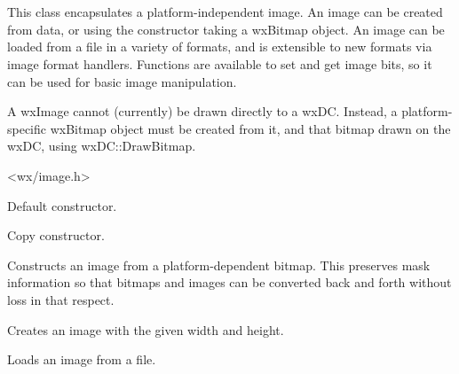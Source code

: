 \section{}\label{wximage}

This class encapsulates a platform-independent image. An image can be created
from data, or using the constructor taking a wxBitmap object. An image
can be loaded from a file in a variety of formats, and is extensible to new formats
via image format handlers. Functions are available to set and get image bits, so
it can be used for basic image manipulation.

A wxImage cannot (currently) be drawn directly to a wxDC. Instead, a platform-specific
wxBitmap object must be created from it, and that bitmap drawn on the wxDC, using
wxDC::DrawBitmap.




<wx/image.h>




\label{wximageconstr}


Default constructor.


Copy constructor.


Constructs an image from a platform-dependent bitmap. This preserves
mask information so that bitmaps and images can be converted back
and forth without loss in that respect.


Creates an image with the given width and height.



Loads an image from a file.


